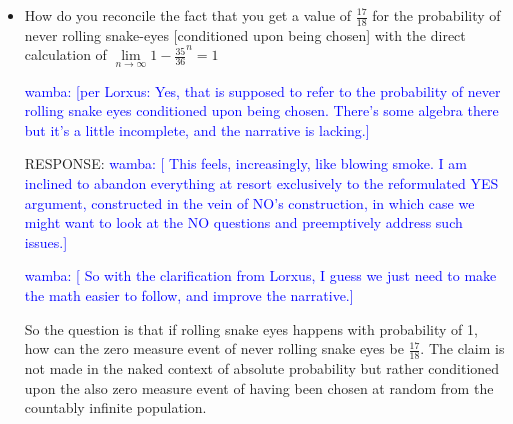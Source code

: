 \documentclass[article,twocolumn]{memoir}
\newcommand{\wamba} [1]{\ifnum\Chatty=1 \textcolor{blue}{wamba:  [#1]} \fi}
\begin{document}
\begin{itemize}
        \wamba{[Do we even need to choose from an infinite population?  What if we simply say. With probability 1, you play in Round $i$, then what are the odds that the game ends in Round $i$ vs the odds that the game ends in Round $j>i$, again we ignore all the $j<i$]}
\item How do you reconcile the fact that you get a value of $\frac{17}{18}$ for the probability of never rolling snake-eyes [conditioned upon being chosen] with the direct calculation of $\underset{n\to\infty}{\lim}1-\frac{35}{36}^n=1$

\wamba{per Lorxus: Yes, that is supposed to refer to the  probability of never rolling snake eyes conditioned upon being chosen. There's some algebra there but it's a little incomplete, and the narrative is lacking.}
    
    {\color{violet}
        RESPONSE: 
        \wamba{ This feels, increasingly, like blowing smoke. I am inclined to abandon everything at resort exclusively to the reformulated YES argument, constructed in the vein of NO's construction, in which case we might want to look at the NO questions and preemptively address such issues.}

        \wamba{ So with the clarification from Lorxus, I guess we just need to make the math easier to follow, and improve the narrative.}
        
        So the question is that if rolling snake eyes happens with probability of 1, how can the zero measure event of never rolling snake eyes be $\frac{17}{18}$.  The claim is not made in the naked context of absolute probability but rather conditioned upon the also zero measure event of having been chosen at random from the countably infinite population.

}
\end{itemize}
\end{document}
